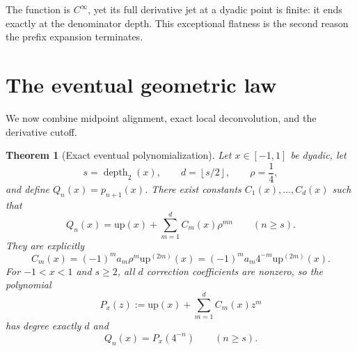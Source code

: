 \documentclass[11pt,oneside]{article}
\numberwithin{equation}{section}
\newtheorem{theorem}{Theorem}[section]
\theoremstyle{definition}
\theoremstyle{remark}
\newcommand{\upf}{\mathrm{up}}
\newcommand{\floor}[1]{\left\lfloor #1\right\rfloor}
\newcommand{\depth}{\operatorname{depth}_2}
\begin{document}
The function is $C^\infty$, yet its full derivative jet at a dyadic point is
finite: it ends exactly at the denominator depth.  This exceptional flatness is
the second reason the prefix expansion terminates.

\section{The eventual geometric law}

We now combine midpoint alignment, exact local deconvolution, and the derivative
cutoff.

\begin{theorem}[Exact eventual polynomialization]
\label{thm:eventual-law}
Let $x\in[-1,1]$ be dyadic, let
\begin{equation}
 s=\depth(x),\qquad d=\floor{s/2},\qquad \rho=\frac14,
 \label{eq:s-d-rho}
\end{equation}
and define $Q_n(x)=p_{n+1}(x)$.  There exist constants
$C_1(x),\ldots,C_d(x)$ such that
\begin{equation}
 \boxed{\displaystyle
 Q_n(x)=\upf(x)+\sum_{m=1}^{d}C_m(x)\rho^{mn}
 \qquad(n\ge s).}
 \label{eq:eventual-geometric-law}
\end{equation}
They are explicitly
\begin{equation}
 \boxed{\displaystyle
 C_m(x)=(-1)^ma_m\rho^m\upf^{(2m)}(x)
       =(-1)^ma_m4^{-m}\upf^{(2m)}(x).}
 \label{eq:Cm-derivative}
\end{equation}
For $-1<x<1$ and $s\ge2$, all $d$ correction coefficients are nonzero, so the
polynomial
\begin{equation}
 P_x(z):=\upf(x)+\sum_{m=1}^{d}C_m(x)z^m
 \label{eq:Px}
\end{equation}
has degree exactly $d$ and
\begin{equation}
 Q_n(x)=P_x(4^{-n})\qquad(n\ge s).
 \label{eq:polynomialized-sequence}
\end{equation}
\end{theorem}
\end{document}
